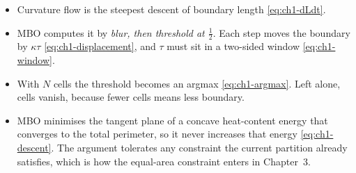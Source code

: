 \begin{itemize}[nosep]
  \item Curvature flow is the steepest descent of boundary length
        \eqref{eq:ch1-dLdt}.
  \item MBO computes it by \emph{blur, then threshold at $\tfrac12$}. Each step moves
        the boundary by $\kappa\tau$ \eqref{eq:ch1-displacement}, and $\tau$ must sit
        in a two-sided window \eqref{eq:ch1-window}.
  \item With $N$ cells the threshold becomes an argmax \eqref{eq:ch1-argmax}.
        Left alone, cells vanish, because fewer cells means less boundary.
  \item MBO minimises the tangent plane of a concave heat-content energy
        that converges to the total perimeter, so it never increases that energy
        \eqref{eq:ch1-descent}. The argument tolerates any constraint the current
        partition already satisfies, which is how the equal-area constraint enters
        in Chapter~3.
\end{itemize}
